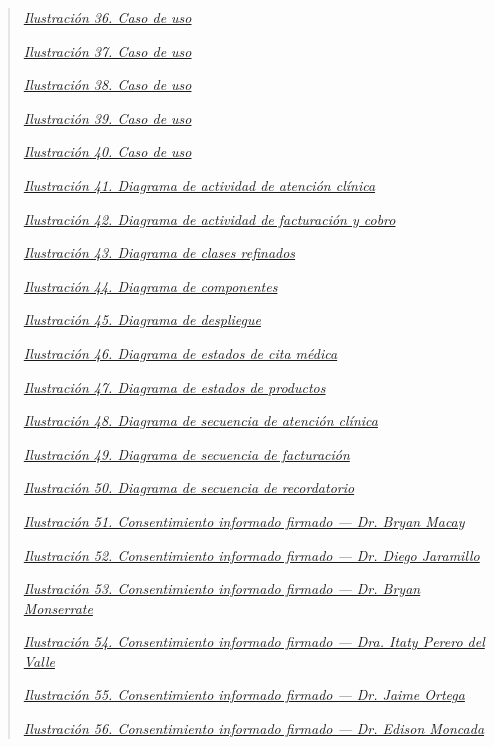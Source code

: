\documentclass[
]{article}
\begin{document}
\begin{quote}
\hyperref[fig36]{\emph{Ilustración 36. Caso de uso}}

\hyperref[fig37]{\emph{Ilustración 37. Caso de uso}}

\hyperref[fig38]{\emph{Ilustración 38. Caso de uso}}

\hyperref[fig39]{\emph{Ilustración 39. Caso de uso}}

\hyperref[fig40]{\emph{Ilustración 40. Caso de uso}}

\hyperref[fig41]{\emph{Ilustración 41. Diagrama de actividad de atención clínica}}

\hyperref[fig42]{\emph{Ilustración 42. Diagrama de actividad de facturación y cobro}}

\hyperref[fig43]{\emph{Ilustración 43. Diagrama de clases refinados}}

\hyperref[fig44]{\emph{Ilustración 44. Diagrama de componentes}}

\hyperref[fig45]{\emph{Ilustración 45. Diagrama de despliegue}}

\hyperref[fig46]{\emph{Ilustración 46. Diagrama de estados de cita médica}}

\hyperref[fig47]{\emph{Ilustración 47. Diagrama de estados de productos}}

\hyperref[fig48]{\emph{Ilustración 48. Diagrama de secuencia de atención clínica}}

\hyperref[fig49]{\emph{Ilustración 49. Diagrama de secuencia de facturación}}

\hyperref[fig50]{\emph{Ilustración 50. Diagrama de secuencia de recordatorio}}

\hyperref[consentimiento-bryan-macay]{\emph{Ilustración 51. Consentimiento informado firmado --- Dr. Bryan Macay}}

\hyperref[consentimiento-diego-jaramillo]{\emph{Ilustración 52. Consentimiento informado firmado --- Dr. Diego Jaramillo}}

\hyperref[consentimiento-bryan-monserrate]{\emph{Ilustración 53. Consentimiento informado firmado --- Dr. Bryan Monserrate}}

\hyperref[consentimiento-itati-perero]{\emph{Ilustración 54. Consentimiento informado firmado --- Dra. Itaty Perero del Valle}}

\hyperref[consentimiento-jaime-ortega]{\emph{Ilustración 55. Consentimiento informado firmado --- Dr. Jaime Ortega}}

\hyperref[consentimiento-edison-moncada]{\emph{Ilustración 56. Consentimiento informado firmado --- Dr. Edison Moncada}}


\end{quote}
\end{document}
